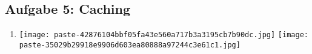 \documentclass[12pt,a4paper]{article}
\begin{document}
\subsection*{Aufgabe 5: Caching}

\begin{enumerate}[label=\alph*), topsep=5pt, itemsep=10pt]
\item \mbox{}\begin{center}\texttt{[image: paste-42876104bbf05fa43e560a717b3a3195cb7b90dc.jpg]}
\texttt{[image: paste-35029b29918e9906d603ea80888a97244c3e61c1.jpg]}
\end{center}
\end{enumerate}
\clearpage
\end{document}
